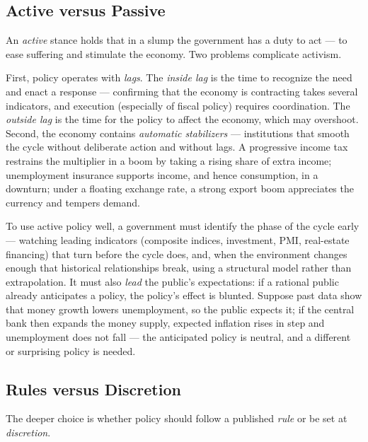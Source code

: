 \subsection{Active versus Passive}

An \emph{active} stance holds that in a slump the government has a duty to act --- to ease suffering and stimulate the economy. Two problems complicate activism.

First, policy operates with \emph{lags}. The \emph{inside lag} is the time to recognize the need and enact a response --- confirming that the economy is contracting takes several indicators, and execution (especially of fiscal policy) requires coordination. The \emph{outside lag} is the time for the policy to affect the economy, which may overshoot. Second, the economy contains \emph{automatic stabilizers} --- institutions that smooth the cycle without deliberate action and without lags. A progressive income tax restrains the multiplier in a boom by taking a rising share of extra income; unemployment insurance supports income, and hence consumption, in a downturn; under a floating exchange rate, a strong export boom appreciates the currency and tempers demand.

To use active policy well, a government must identify the phase of the cycle early --- watching leading indicators (composite indices, investment, PMI, real-estate financing) that turn before the cycle does, and, when the environment changes enough that historical relationships break, using a structural model rather than extrapolation. It must also \emph{lead} the public's expectations: if a rational public already anticipates a policy, the policy's effect is blunted. Suppose past data show that money growth lowers unemployment, so the public expects it; if the central bank then expands the money supply, expected inflation rises in step and unemployment does not fall --- the anticipated policy is neutral, and a different or surprising policy is needed.

\subsection{Rules versus Discretion}

The deeper choice is whether policy should follow a published \emph{rule} or be set at \emph{discretion}.


